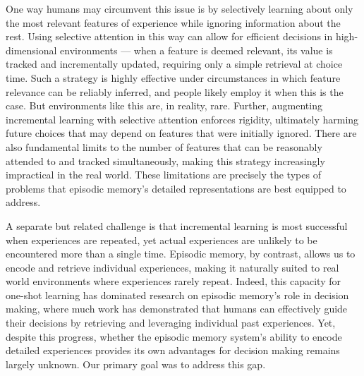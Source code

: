 \documentclass[10pt,letterpaper]{article}
\begin{document}
One way humans may circumvent this issue is by selectively learning about only the most relevant features of experience while ignoring information about the rest\cite{wilsonInferringRelevanceChanging2012}. Using selective attention in this way can allow for efficient decisions in high-dimensional environments --- when a feature is deemed relevant, its value is tracked and incrementally updated, requiring only a simple retrieval at choice time. Such a strategy is highly effective under circumstances in which feature relevance can be reliably inferred, and people likely employ it when this is the case\cite{leongDynamicInteractionReinforcement2017, nivReinforcementLearningMultidimensional2015}. But environments like this are, in reality, rare. Further, augmenting incremental learning with selective attention enforces rigidity, ultimately harming future choices that may depend on features that were initially ignored. There are also fundamental limits to the number of features that can be reasonably attended to and tracked simultaneously\cite{millerMagicalNumberSeven1956}, making this strategy increasingly impractical in the real world. These limitations are precisely the types of problems that episodic memory's detailed representations are best equipped to address.

A separate but related challenge is that incremental learning is most successful when experiences are repeated, yet actual experiences are unlikely to be encountered more than a single time. Episodic memory, by contrast, allows us to encode and retrieve individual experiences, making it naturally suited to real world environments where experiences rarely repeat\cite{gershmanReinforcementLearningEpisodic2017}. Indeed, this capacity for one-shot learning has dominated research on episodic memory's role in decision making, where much work has demonstrated that humans can effectively guide their decisions by retrieving and leveraging individual past experiences\cite{bornsteinRemindersChoicesBias2017, duncanModulatingUseMultiple2019, masonBiasedConfabulationRisky2020, nicholasUncertaintyAltersBalance2022a, montaser-kouhsariTwoRoutesValuebased2024, plonskyRelianceSmallSamples2015}. Yet, despite this progress, whether the episodic memory system's ability to encode detailed experiences provides its own advantages for decision making remains largely unknown. Our primary goal was to address this gap.
\end{document}
